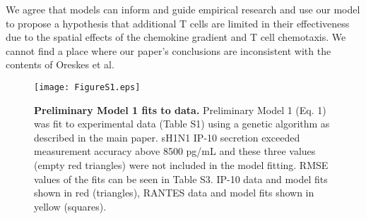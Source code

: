 \documentclass[10pt]{article}
\newenvironment{response}{\fontfamily{cmr}}{\par}
\begin{document}
\begin{enumerate}
\begin{response}
\begin{itemize}
\end{itemize}

We agree that models can inform and guide empirical research and use our model to propose
a hypothesis that additional T cells are limited in their
effectiveness due to the spatial effects of the chemokine gradient and
T cell chemotaxis.  We cannot find a place where our paper's
conclusions are inconsistent with the contents of Oreskes et al.
\end{response}

\end{enumerate}


\setcounter{figure}{0}
\renewcommand{\thefigure}{S\arabic{figure}}

\begin{figure}[b]
\begin{center}
\texttt{[image: FigureS1.eps]}
\caption{{\bf Preliminary Model 1 fits to data.}  Preliminary Model 1 (Eq. 1) was fit to experimental data (Table S1) using a genetic algorithm as described in the main paper.  sH1N1 IP-10 secretion exceeded measurement accuracy above 8500 pg/mL and these three values (empty red triangles) were not included in the model fitting.  RMSE values of the fits can be seen in Table S3.  IP-10 data and model fits shown in red (triangles), RANTES data and model fits shown in yellow (squares).}
\label{fig:fits}
\end{center}
\end{figure}
\end{document}
